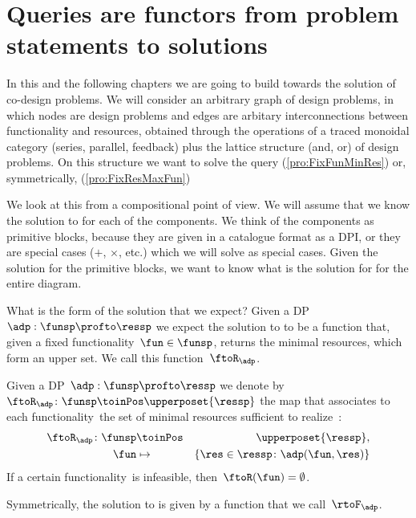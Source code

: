 \section{Queries are functors from problem statements to solutions}

In this and the following chapters we are going to build towards the solution of co-design problems.
We will consider an arbitrary graph of design problems, in which nodes are design problems and edges are arbitary interconnections between functionality and resources, obtained through the operations of a traced monoidal category (series, parallel, feedback) plus the lattice structure (and, or) of design problems. On this structure we want to solve the query \FixFunMinRes (\cref{pro:FixFunMinRes}) or, symmetrically, \FixResMaxFun (\cref{pro:FixResMaxFun})


We look at this from a compositional point of view. We will assume that we know the solution to \FixFunMinRes for each of the components. We think of the components as primitive blocks, because they are given in a catalogue format as a DPI, or they are special cases ($+$, $\times$, etc.) which we will solve as special cases.  Given the solution for the primitive blocks, we want to know what is the solution for \FixFunMinRes for the entire diagram.

What is the form of the solution that we expect? Given a DP $\adp: \funsp \profto \ressp$ we expect the solution to \FixFunMinRes to be a function that, given a fixed functionality~$\fun\in\funsp$, returns the minimal resources, which form an upper set. We call this function~$\ftoR_\adp$.

\begin{definition}
  \label{def:ftoR-dp}
  Given a DP~$\adp:\funsp\profto\ressp$
  we denote by~$\ftoR_{\adp}\colon \funsp\toinPos \upperposet{\ressp}$ the map that associates
  to each functionality~\fun the set of minimal resources sufficient to realize~\fun:
  \begin{eqnarray*}
    \ftoR_{\adp}\colon \funsp & \toinPos & \upperposet{\ressp},\\
    \fun& \mapsto & \{ \res \in \ressp \colon \adp(\fun, \res)\}
  \end{eqnarray*}
  If a certain functionality~\fun is infeasible, then~$\ftoR(\fun)=\emptyset$.
\end{definition}


Symmetrically, the solution to \FixResMaxFun is given by a function that we call~$\rtoF_\adp$.

